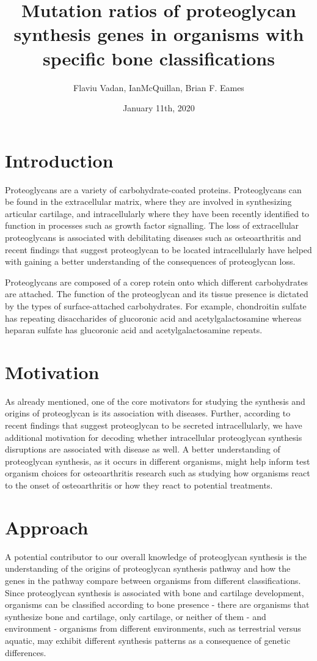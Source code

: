 \documentclass{article}
\title{Mutation ratios of proteoglycan synthesis genes in organisms with specific bone classifications}
\author{Flaviu Vadan, IanMcQuillan, Brian F. Eames}
\date{January 11th, 2020}
\begin{document}
\maketitle

\section{Introduction}
Proteoglycans are a variety of carbohydrate-coated proteins. Proteoglycans can be found in the extracellular matrix, where they are involved in synthesizing articular cartilage, and intracellularly where they have been recently identified to function in processes such as growth factor signalling. The loss of extracellular proteoglycans is associated with debilitating  diseases such as osteoarthritis and recent findings that suggest proteoglycan to be located intracellularly have helped with gaining a better understanding of the consequences of proteoglycan loss. 

Proteoglycans are composed of a corep rotein onto which different carbohydrates are attached. The function of the proteoglycan and its tissue presence is dictated by the types of surface-attached carbohydrates. For example,  chondroitin sulfate has repeating disaccharides of glucoronic acid and acetylgalactosamine whereas heparan sulfate has glucoronic acid and acetylgalactosamine repeats.

\section{Motivation}
As already mentioned, one of the core motivators for studying the synthesis and origins of proteoglycan is its association with diseases. Further, according to recent findings that suggest proteoglycan to be secreted intracellularly, we have additional motivation for decoding whether intracellular proteoglycan synthesis disruptions are associated with disease as well. A better understanding of proteoglycan synthesis, as it occurs in different organisms, might help inform test organism choices for osteoarthritis research such as studying how organisms react to the onset of osteoarthritis or how they react to potential treatments.

\section{Approach}
A potential contributor to our overall knowledge of proteoglycan synthesis is the understanding of the origins of proteoglycan synthesis pathway and how the genes in the pathway compare between organisms from different classifications. Since proteoglycan synthesis is associated with bone and cartilage development, organisms can be classified according to bone presence - there are organisms that synthesize bone and cartilage, only cartilage, or neither of them - and environment - organisms from different environments, such as terrestrial versus aquatic, may exhibit different synthesis patterns as a consequence of genetic differences. 
\end{document}
